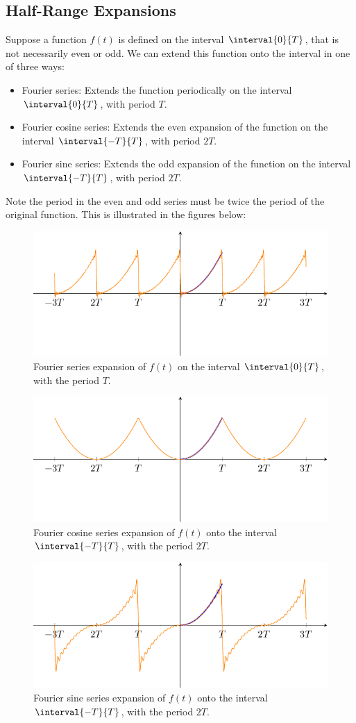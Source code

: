 \documentclass{article}
\begin{document}
\subsection{Half-Range Expansions}
Suppose a function \(f\left( t \right)\) is defined on the interval
\(\interval{0}{T}\), that is not necessarily even or odd. We can extend
this function onto the interval in one of three ways:
\begin{itemize}
    \item Fourier series: Extends the function periodically on the
          interval \(\interval{0}{T}\), with period \(T\).
    \item Fourier cosine series: Extends the even expansion of the
          function on the interval \(\interval{-T}{T}\), with period
          \(2T\).
    \item Fourier sine series: Extends the odd expansion of the function
          on the interval \(\interval{-T}{T}\), with period \(2T\).
\end{itemize}
Note the period in the even and odd series must be twice the period of
the original function. This is illustrated in the figures below:
\begin{figure}[H]
    \centering
    \includegraphics[width = 0.8\linewidth]{figures/half_range_expansion_Fourier.pdf}
    \caption{Fourier series expansion of \(f\left( t \right)\) on the interval \(\interval{0}{T}\), with the period \(T\).} %
\end{figure}
\begin{figure}[H]
    \centering
    \includegraphics[width = 0.8\linewidth]{figures/half_range_expansion_Cosine.pdf}
    \caption{Fourier cosine series expansion of \(f\left( t \right)\) onto the interval \(\interval{-T}{T}\), with the period \(2T\).} %
\end{figure}
\begin{figure}[H]
    \centering
    \includegraphics[width = 0.8\linewidth]{figures/half_range_expansion_Sine.pdf}
    \caption{Fourier sine series expansion of \(f\left( t \right)\) onto the interval \(\interval{-T}{T}\), with the period \(2T\).} %
\end{figure}
\end{document}
